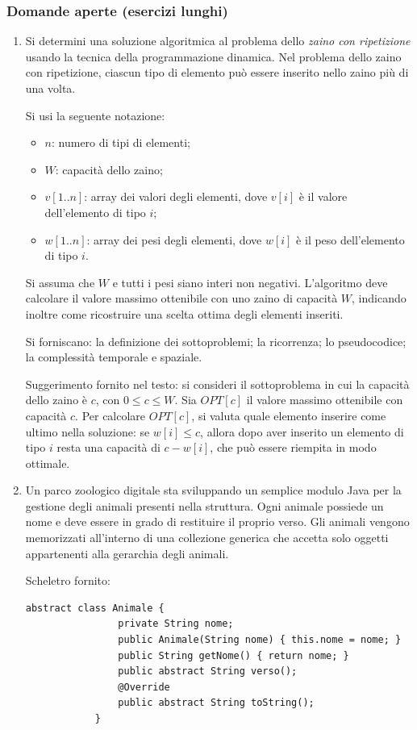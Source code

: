	\subsubsection{Domande aperte (esercizi lunghi)}
	
	\begin{enumerate}
		\item Si determini una soluzione algoritmica al problema dello \emph{zaino con ripetizione} usando la tecnica della programmazione dinamica. Nel problema dello zaino con ripetizione, ciascun tipo di elemento può essere inserito nello zaino più di una volta.
		
		Si usi la seguente notazione:
		\begin{itemize}
			\item $n$: numero di tipi di elementi;
			\item $W$: capacità dello zaino;
			\item $v[1..n]$: array dei valori degli elementi, dove $v[i]$ è il valore dell'elemento di tipo $i$;
			\item $w[1..n]$: array dei pesi degli elementi, dove $w[i]$ è il peso dell'elemento di tipo $i$.
		\end{itemize}
		Si assuma che $W$ e tutti i pesi siano interi non negativi. L'algoritmo deve calcolare il valore massimo ottenibile con uno zaino di capacità $W$, indicando inoltre come ricostruire una scelta ottima degli elementi inseriti.
		
		Si forniscano: la definizione dei sottoproblemi; la ricorrenza; lo pseudocodice; la complessità temporale e spaziale.
		
		Suggerimento fornito nel testo: si consideri il sottoproblema in cui la capacità dello zaino è $c$, con $0\le c\le W$. Sia $OPT[c]$ il valore massimo ottenibile con capacità $c$. Per calcolare $OPT[c]$, si valuta quale elemento inserire come ultimo nella soluzione: se $w[i]\le c$, allora dopo aver inserito un elemento di tipo $i$ resta una capacità di $c-w[i]$, che può essere riempita in modo ottimale.
		
		\item Un parco zoologico digitale sta sviluppando un semplice modulo Java per la gestione degli animali presenti nella struttura. Ogni animale possiede un nome e deve essere in grado di restituire il proprio verso. Gli animali vengono memorizzati all'interno di una collezione generica che accetta solo oggetti appartenenti alla gerarchia degli animali.
		
		Scheletro fornito:
		\begin{lstlisting}[style=java]
			abstract class Animale {
				private String nome;
				public Animale(String nome) { this.nome = nome; }
				public String getNome() { return nome; }
				public abstract String verso();
				@Override
				public abstract String toString();
			}
			

\end{lstlisting}
\end{enumerate}
